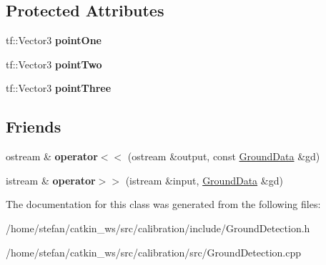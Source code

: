 \subsection*{\-Protected \-Attributes}
\begin{DoxyCompactItemize}
\item 
\hypertarget{classGroundData_a7f01fcceb40d9fe1e90b9707a0f27d12}{tf\-::\-Vector3 {\bfseries point\-One}}\label{classGroundData_a7f01fcceb40d9fe1e90b9707a0f27d12}

\item 
\hypertarget{classGroundData_a9eb9983429699256738d73cf3c0a7966}{tf\-::\-Vector3 {\bfseries point\-Two}}\label{classGroundData_a9eb9983429699256738d73cf3c0a7966}

\item 
\hypertarget{classGroundData_aa7b6a40d7d2fb99a93eb62b9929b6684}{tf\-::\-Vector3 {\bfseries point\-Three}}\label{classGroundData_aa7b6a40d7d2fb99a93eb62b9929b6684}

\end{DoxyCompactItemize}
\subsection*{\-Friends}
\begin{DoxyCompactItemize}
\item 
\hypertarget{classGroundData_aa4a16a3561c64b16b9c9b696af4546f7}{ostream \& {\bfseries operator$<$$<$} (ostream \&output, const \hyperlink{classGroundData}{\-Ground\-Data} \&gd)}\label{classGroundData_aa4a16a3561c64b16b9c9b696af4546f7}

\item 
\hypertarget{classGroundData_a7f52aaea73e092112650755b2c5041da}{istream \& {\bfseries operator$>$$>$} (istream \&input, \hyperlink{classGroundData}{\-Ground\-Data} \&gd)}\label{classGroundData_a7f52aaea73e092112650755b2c5041da}

\end{DoxyCompactItemize}


\-The documentation for this class was generated from the following files\-:\begin{DoxyCompactItemize}
\item 
/home/stefan/catkin\-\_\-ws/src/calibration/include/\-Ground\-Detection.\-h\item 
/home/stefan/catkin\-\_\-ws/src/calibration/src/\-Ground\-Detection.\-cpp\end{DoxyCompactItemize}
